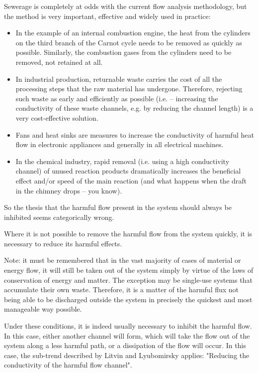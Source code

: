 \documentclass[a4paper,11pt]{article}
\begin{document}
Sewerage is completely at odds with the current flow analysis methodology, but
the method is very important, effective and widely used in practice:
\begin{itemize}
\item In the example of an internal combustion engine, the heat from the
  cylinders on the third branch of the Carnot cycle needs to be removed as
  quickly as possible. Similarly, the combustion gases from the cylinders need
  to be removed, not retained at all.
\item In industrial production, returnable waste carries the cost of all the
  processing steps that the raw material has undergone. Therefore, rejecting
  such waste as early and efficiently as possible (i.e. -- increasing the
  conductivity of these waste channels, e.g. by reducing the channel length)
  is a very cost-effective solution.
\item Fans and heat sinks are measures to increase the conductivity of harmful
  heat flow in electronic appliances and generally in all electrical machines.
\item In the chemical industry, rapid removal (i.e. using a high conductivity
  channel) of unused reaction products dramatically increases the beneficial
  effect and/or speed of the main reaction (and what happens when the draft in
  the chimney drops -- you know).
\end{itemize}
So the thesis that the harmful flow present in the system should always be
inhibited seems categorically wrong.

Where it is not possible to remove the harmful flow from the system quickly,
it is necessary to reduce its harmful effects.

Note: it must be remembered that in the vast majority of cases of material or
energy flow, it will still be taken out of the system simply by virtue of the
laws of conservation of energy and matter. The exception may be single-use
systems that accumulate their own waste. Therefore, it is a matter of the
harmful flux not being able to be discharged outside the system in precisely
the quickest and most manageable way possible.

Under these conditions, it is indeed usually necessary to inhibit the harmful
flow. In this case, either another channel will form, which will take the flow
out of the system along a less harmful path, or a dissipation of the flow will
occur. In this case, the sub-trend described by Litvin and Lyubomirsky
applies: "Reducing the conductivity of the harmful flow channel".
\end{document}
